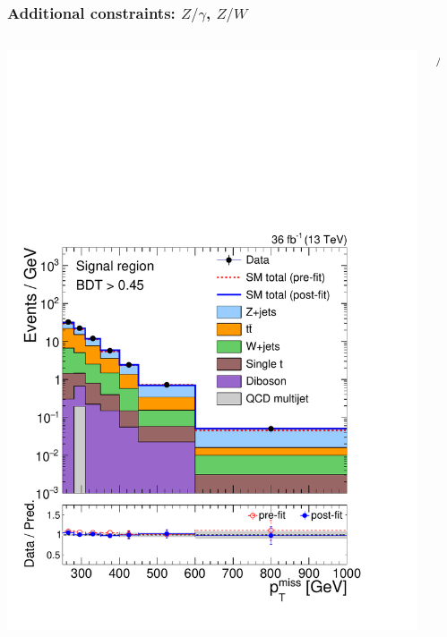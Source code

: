 \documentclass[aspectratio=169,xcolor=dvipsnames,,table,compress]{beamer}
\begin{document}
\begin{frame} \frametitle{Additional constraints: $Z/\gamma$, $Z/W$}
  \vspace{-5mm}
  \begin{columns}
    \begin{column}{0.3\textwidth}
      \includegraphics[width=\textwidth]{../figures/monotop/postfit/stackedPostfit_signal_monotop.pdf}
    \end{column}
    \begin{column}{0.05\textwidth} $\Big/$ \end{column}
    \begin{column}{0.3\textwidth}

\end{column}
\end{columns}
\end{frame}
\end{document}
